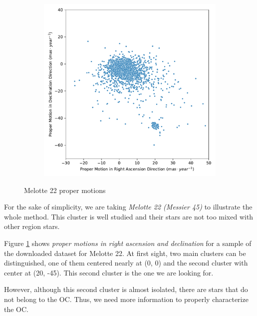 \documentclass[11pt, a4paper, english]{book}
\begin{document}
\begin{figure}[htbp]
  \centering
  \begin{subfigure}{0.5\textwidth}
    \centering
    \includegraphics[width=\textwidth]{../figures/raw_pm_melotte_22.pdf}
  \end{subfigure}
  \caption{Melotte 22 proper motions}
  \label{fig:raw_pm_melotte_22}
\end{figure}

For the sake of simplicity, we are taking \emph{Melotte 22 (Messier 45)} \cite{elsanhoury2019ppmxl} to illustrate the whole method. This cluster is well studied
and their stars are not too mixed with other region stars.

Figure \ref{fig:raw_pm_melotte_22} shows \emph{proper motions in right ascension and declination} for a sample of the downloaded dataset for Melotte 22.
At first sight, two main clusters can be distinguished, one of them centered nearly at (0, 0) and the second cluster with center at (20, -45). This second cluster
is the one we are looking for.

However, although this second cluster is almost isolated, there are stars that do not belong to the OC. Thus, we need more information to properly characterize the OC.
\end{document}
